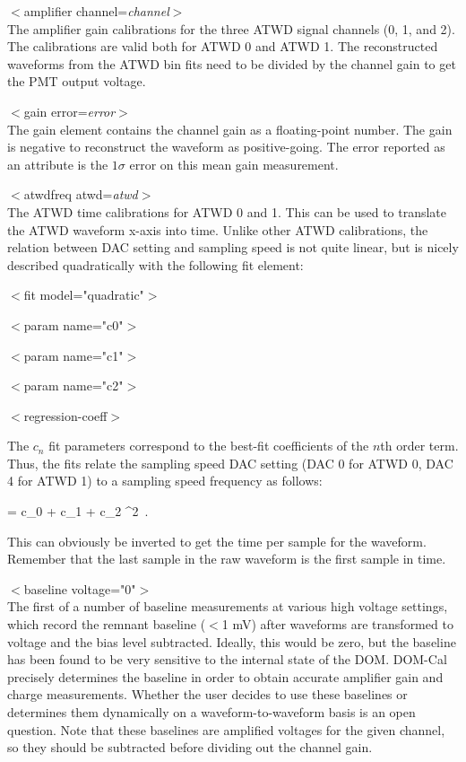 \documentclass[10pt]{article}
\begin{document}

\item{$<$amplifier channel=\textit{channel}$>$}\\
The amplifier gain calibrations for the three ATWD signal channels (0, 1, and 2).
The calibrations are valid both for ATWD 0 and ATWD 1.  The reconstructed
waveforms from the ATWD bin fits need to be divided by the channel gain to
get the PMT output voltage.
\bi
\item{$<$gain error=\textit{error}$>$}\\
The gain element contains the channel gain as a floating-point number.  The
gain is negative to reconstruct the waveform as positive-going.  The error
reported as an attribute is the $1\sigma$ error on this mean gain measurement.  
\ei


\item{$<$atwdfreq atwd=\textit{atwd}$>$}\\
The ATWD time calibrations for ATWD 0 and 1.  This can be used to translate
the ATWD waveform x-axis into time.  Unlike other ATWD calibrations,
the relation between DAC setting and sampling speed is not quite linear,
but is nicely described quadratically with the following fit element:

\bi
\item{$<$fit model="quadratic"$>$}
\bi
\item{$<$param name="c0"$>$}
\item{$<$param name="c1"$>$}
\item{$<$param name="c2"$>$}
\item{$<$regression-coeff$>$}
\ei
\ei

The $c_n$ fit parameters correspond to the best-fit coefficients of the
$n$th order term.  Thus, the fits relate the sampling speed DAC setting
(DAC 0 for ATWD 0, DAC 4 for ATWD 1) to a sampling speed frequency as
follows: 

\be
{} = c_0 + c_1 \cdot {} + c_2
\cdot {}^2\ .
\ee

This can obviously be inverted to get the time per sample for the
waveform.  Remember that the last sample in the raw waveform is the first
sample in time.


\item{$<$baseline voltage="0"$>$}\\ 
The first of a number of baseline measurements at various high voltage
settings, which record the remnant baseline ($<$1 mV) after waveforms are
transformed to voltage and the bias level subtracted.  Ideally, this would
be zero, but the baseline has been found to be very sensitive to the
internal state of the DOM.  DOM-Cal precisely determines the baseline in
order to obtain accurate amplifier gain and charge measurements.  Whether
the user decides to use these baselines or determines them dynamically on a
waveform-to-waveform basis is an open question.  Note that these baselines
are amplified voltages for the given channel, so they should be subtracted
before dividing out the channel gain.\\
\end{document}

